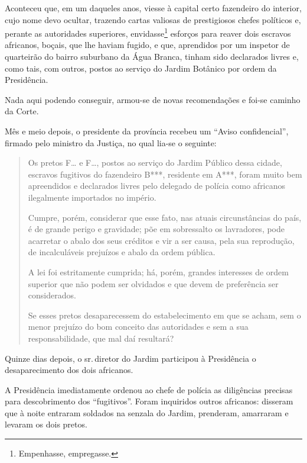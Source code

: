 Aconteceu que, em um daqueles anos, viesse à capital certo fazendeiro do
interior, cujo nome devo ocultar, trazendo cartas valiosas de
prestigiosos chefes políticos e, perante as autoridades superiores,
envidasse\footnote{Empenhasse, empregasse.} esforços para reaver dois
escravos africanos, boçais, que lhe haviam fugido, e que, aprendidos por
um inspetor de quarteirão do bairro suburbano da Água Branca, tinham
sido declarados livres e, como tais, com outros, postos ao serviço do
Jardim Botânico por ordem da Presidência.

Nada aqui podendo conseguir, armou-se de novas recomendações e foi-se
caminho da Corte.

Mês e meio depois, o presidente da província recebeu um ``Aviso
confidencial'', firmado pelo ministro da Justiça, no qual lia-se o
seguinte:

\begin{quote}
Os pretos F\ldots{} e F\ldots{}, postos ao serviço do Jardim Público dessa
cidade, escravos fugitivos do fazendeiro B***, residente em A***, foram
muito bem apreendidos e declarados livres pelo delegado de polícia como
africanos ilegalmente importados no império.

Cumpre, porém, considerar que esse fato, nas atuais circunstâncias do
país, é de grande perigo e gravidade; põe em sobressalto os lavradores,
pode acarretar o abalo dos seus créditos e vir a ser causa, pela sua
reprodução, de incalculáveis prejuízos e abalo da ordem pública.

A lei foi estritamente cumprida; há, porém, grandes interesses de ordem
superior que não podem ser olvidados e que devem de preferência ser
considerados.

Se esses pretos desaparecessem do estabelecimento em que se acham, sem o
menor prejuízo do bom conceito das autoridades e sem a sua
responsabilidade, que mal daí resultará?
\end{quote}

\noindent\dotfill{}

Quinze dias depois, o sr.\,diretor do Jardim participou à Presidência o
desaparecimento dos dois africanos.

A Presidência imediatamente ordenou ao chefe de polícia as diligências
precisas para descobrimento dos ``fugitivos''. Foram inquiridos outros
africanos: disseram que à noite entraram soldados na senzala do Jardim,
prenderam, amarraram e levaram os dois pretos.

